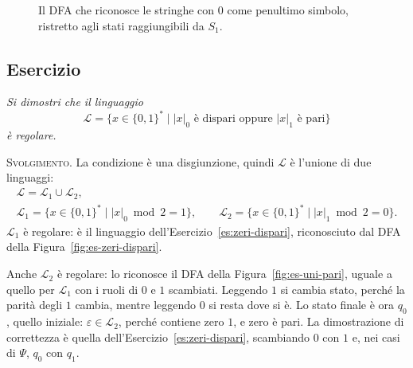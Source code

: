 \documentclass[a4paper, 11pt, oneside]{book}
\makeatletter
\theoremstyle{formale}
\newcommand{\spaziominimo}[1]{%
    \par
    \if@nobreak\else
        \ifdim\pagegoal<\maxdimen
            \ifdim\dimexpr\pagegoal-\pagetotal\relax<#1\relax
                \ifdim\pagetotal>\pagegoal\else
                    \newpage
                \fi
            \fi
        \fi
    \fi}
\newcounter{escount}[section]
\newcommand{\esercizio}{
    \spaziominimo{8\baselineskip}%
    \refstepcounter{escount}%
    \subsection*{Esercizio \arabic{escount}}%
}
\makeatother
\begin{document}
    \begin{figure}[H]
        \centering
        \caption{Il DFA che riconosce le stringhe con $0$ come penultimo simbolo,
            ristretto agli stati raggiungibili da $S_1$.}
        \label{fig:es-penultimo-dfa}
    \end{figure}

    \esercizio
    \textit{Si dimostri che il linguaggio
    \begin{equation*}
        \mathcal{L} = \{x \in \{0, 1\}^* \mid |x|_0 \text{ \`e dispari oppure } |x|_1
        \text{ \`e pari}\}
    \end{equation*}
    \`e regolare.}

    \textsc{Svolgimento}. La condizione \`e una disgiunzione, quindi $\mathcal{L}$ \`e
    l'unione di due linguaggi:
    \begin{gather*}
        \mathcal{L} = \mathcal{L}_1 \cup \mathcal{L}_2, \\
        \mathcal{L}_1 = \{x \in \{0, 1\}^* \mid |x|_0 \bmod 2 = 1\}, \qquad
        \mathcal{L}_2 = \{x \in \{0, 1\}^* \mid |x|_1 \bmod 2 = 0\}.
    \end{gather*}
    $\mathcal{L}_1$ \`e regolare: \`e il linguaggio dell'Esercizio~\ref{es:zeri-dispari},
    riconosciuto dal DFA della Figura~\ref{fig:es-zeri-dispari}.

    Anche $\mathcal{L}_2$ \`e regolare: lo riconosce il DFA della
    Figura~\ref{fig:es-uni-pari}, uguale a quello per $\mathcal{L}_1$ con i ruoli di $0$
    e $1$ scambiati. Leggendo $1$ si cambia stato, perch\'e la parit\`a degli $1$ cambia,
    mentre leggendo $0$ si resta dove si \`e. Lo stato finale \`e ora $q_0$, quello
    iniziale: $\varepsilon \in \mathcal{L}_2$, perch\'e contiene zero $1$, e zero \`e
    pari. La dimostrazione di correttezza \`e quella dell'Esercizio~\ref{es:zeri-dispari},
    scambiando $0$ con $1$ e, nei casi di $\Psi$, $q_0$ con $q_1$.
\end{document}
